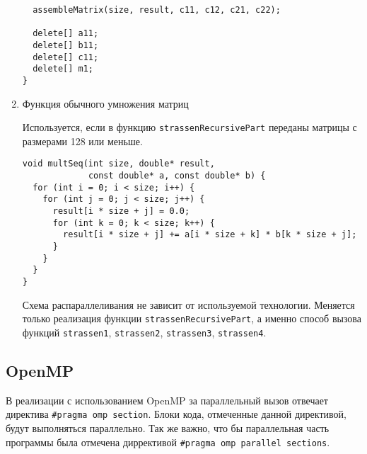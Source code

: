 \documentclass{report}
\begin{document}
\begin{enumerate}
\begin{lstlisting}
  assembleMatrix(size, result, c11, c12, c21, c22);

  delete[] a11;
  delete[] b11;
  delete[] c11;
  delete[] m1;
}
\end{lstlisting}

\item Функция обычного умножения матриц

\par Используется, если в функцию \lstinline{strassenRecursivePart} переданы матрицы с размерами 128 или меньше.

\begin{lstlisting}
void multSeq(int size, double* result,
             const double* a, const double* b) {
  for (int i = 0; i < size; i++) {
    for (int j = 0; j < size; j++) {
      result[i * size + j] = 0.0;
      for (int k = 0; k < size; k++) {
        result[i * size + j] += a[i * size + k] * b[k * size + j];
      }
    }
  }
}
\end{lstlisting}
\par Схема распараллеливания не зависит от используемой технологии. Меняется только реализация функции \lstinline{strassenRecursivePart}, а именно способ вызова функций \lstinline{strassen1}, \lstinline{strassen2}, \lstinline{strassen3}, \lstinline{strassen4}.

\end{enumerate}

\subsection{OpenMP}
\par В реализации с использованием OpenMP за параллельный вызов отвечает директива \lstinline{#pragma omp section}. Блоки кода, отмеченные данной директивой, будут выполняться параллельно. Так же важно, что бы параллельная часть программы была отмечена диррективой \lstinline{#pragma omp parallel sections}.
\end{document}
